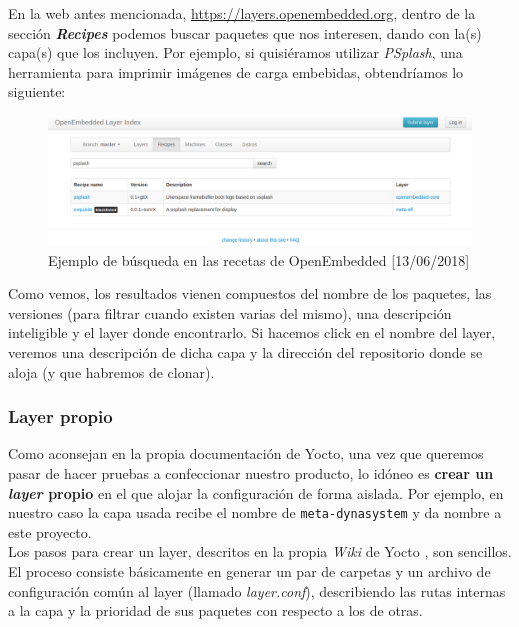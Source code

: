 En la web antes mencionada, \url{https://layers.openembedded.org}, dentro de la sección \textbf{\textit{Recipes}} podemos buscar paquetes que nos interesen, dando con la(s) capa(s) que los incluyen. Por ejemplo, si quisiéramos utilizar \textit{PSplash}, una herramienta para imprimir imágenes de carga embebidas, obtendríamos lo siguiente:

\begin{figure}[H]
	\centering
	\includegraphics[width=\linewidth]{imagenes/yocto-recipe-search-example.png}
	\caption{Ejemplo de búsqueda en las recetas de OpenEmbedded [13/06/2018]}
	\label{yocto-recipe-search-example}
\end{figure}

Como vemos, los resultados vienen compuestos del nombre de los paquetes, las versiones (para filtrar cuando existen varias del mismo), una descripción inteligible y el layer donde encontrarlo. Si hacemos click en el nombre del layer, veremos una descripción de dicha capa y la dirección del repositorio donde se aloja (y que habremos de clonar).\\

\subsubsection{Layer propio}

Como aconsejan en la propia documentación de Yocto, una vez que queremos pasar de hacer pruebas a confeccionar nuestro producto, lo idóneo es \textbf{crear un \textit{layer} propio} en el que alojar la configuración de forma aislada. Por ejemplo, en nuestro caso la capa usada recibe el nombre de \texttt{meta-dynasystem} y da nombre a este proyecto.\\

Los pasos para crear un layer, descritos en la propia \textit{Wiki} de Yocto \cite{wiki-yocto-own-layer}, son sencillos. El proceso consiste básicamente en generar un par de carpetas y un archivo de configuración común al layer (llamado \textit{layer.conf}), describiendo las rutas internas a la capa y la prioridad de sus paquetes con respecto a los de otras.\\

